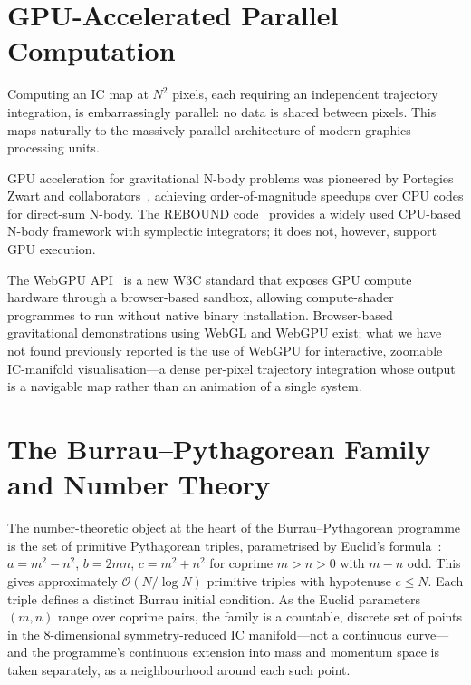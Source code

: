 \documentclass[11pt,a4paper]{article}
\begin{document}
\section{GPU-Accelerated Parallel Computation}

Computing an IC map at $N^2$ pixels, each requiring an independent trajectory integration, is
embarrassingly parallel: no data is shared between pixels.  This maps naturally to the massively
parallel architecture of modern graphics processing units.

GPU acceleration for gravitational N-body problems was pioneered by Portegies Zwart and
collaborators~\cite{portegies2007}, achieving order-of-magnitude speedups over CPU codes for
direct-sum N-body.  The REBOUND code~\cite{rein2012} provides a widely used CPU-based N-body
framework with symplectic integrators; it does not, however, support GPU execution.

The WebGPU API~\cite{webgpu2024} is a new W3C standard that exposes GPU compute hardware
through a browser-based sandbox, allowing compute-shader programmes to run without native
binary installation.  Browser-based gravitational demonstrations using WebGL and WebGPU exist;
what we have not found previously reported is the use of WebGPU for interactive, zoomable
IC-manifold visualisation---a dense per-pixel trajectory integration whose output is a navigable
map rather than an animation of a single system.

\section{The Burrau--Pythagorean Family and Number Theory}
\label{sec:number_theory}

The number-theoretic object at the heart of the Burrau--Pythagorean programme is the set of
primitive Pythagorean triples, parametrised by Euclid's formula~\cite{hardy1979}:
$a = m^2-n^2$, $b = 2mn$, $c = m^2+n^2$ for coprime $m>n>0$ with $m-n$ odd.  This gives
approximately $\mathcal{O}(N/\log N)$ primitive triples with hypotenuse $c \leq N$.  Each
triple defines a distinct Burrau initial condition.  As the Euclid parameters $(m,n)$ range over
coprime pairs, the family is a countable, discrete set of points in the 8-dimensional
symmetry-reduced IC manifold---not a continuous curve---and the programme's continuous extension
into mass and momentum space is taken separately, as a neighbourhood around each such point.
\end{document}
